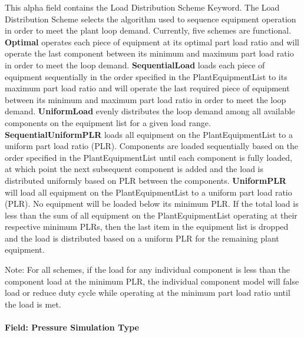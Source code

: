 This alpha field contains the Load Distribution Scheme Keyword. The Load Distribution Scheme selects the algorithm used to sequence equipment operation in order to meet the plant loop demand. Currently, five schemes are functional. \textbf{Optimal} operates each piece of equipment at its optimal part load ratio and will operate the last component between its minimum and maximum part load ratio in order to meet the loop demand. \textbf{SequentialLoad} loads each piece of equipment sequentially in the order specified in the PlantEquipmentList to its maximum part load ratio and will operate the last required piece of equipment between its minimum and maximum part load ratio in order to meet the loop demand. \textbf{UniformLoad} evenly distributes the loop demand among all available components on the equipment list for a given load range. \textbf{SequentialUniformPLR} loads all equipment on the PlantEquipmentList to a uniform part load ratio (PLR). Components are loaded sequentially based on the order specified in the PlantEquipmentList until each component is fully loaded, at which point the next subsequent component is added and the load is distributed uniformly based on PLR between the components. \textbf{UniformPLR} will load all equipment on the PlantEquipmentList to a uniform part load ratio (PLR). No equipment will be loaded below its minimum PLR. If the total load is less than the sum of all equipment on the PlantEquipmentList operating at their respective minimum PLRs, then the last item in the equipment list is dropped and the load is distributed based on a uniform PLR for the remaining plant equipment.

Note: For all schemes, if the load for any individual component is less than the component load at the minimum PLR, the individual component model will false load or reduce duty cycle while operating at the minimum part load ratio until the load is met.

\paragraph{Field: Pressure Simulation Type}\label{field-pressure-simulation-type-1}

